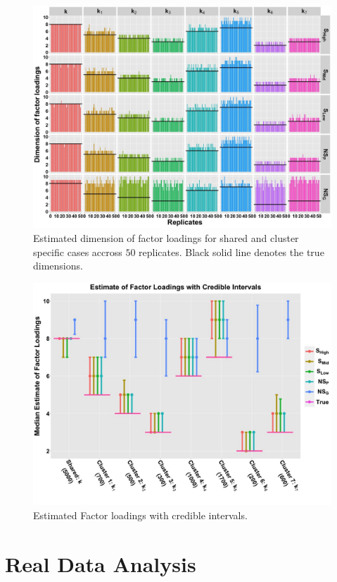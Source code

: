 \documentclass[
]{book}
\begin{document}
\begin{figure}

{\centering \includegraphics[width=0.8\linewidth]{images/Loading_Dimension_plot} 

}

\caption{Estimated dimension of factor loadings for shared and cluster specific cases accross $50$ replicates. Black solid line denotes the true dimensions.}\label{fig:factor1}
\end{figure}

\begin{figure}

{\centering \includegraphics[width=0.8\linewidth]{images/Median_Loading_plot} 

}

\caption{Estimated Factor loadings with credible intervals.}\label{fig:factor2}
\end{figure}

\hypertarget{realdata}{%
\chapter{Real Data Analysis}\label{realdata}}
\end{document}
